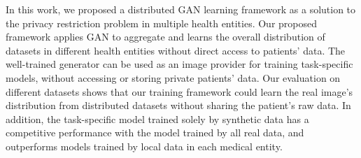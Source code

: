In this work, we proposed a distributed GAN learning framework as a solution to the privacy restriction problem in multiple health entities. Our proposed framework applies GAN to aggregate and learns the overall distribution of datasets in different health entities without direct access to patients' data. The well-trained generator can be used as an image provider for training task-specific models, without accessing or storing private patients' data. Our evaluation on different datasets shows that our training framework could learn the real image's distribution from distributed datasets without sharing the patient's raw data. In addition, the task-specific model trained solely by synthetic data has a competitive performance with the model trained by all real data, and outperforms models trained by local data in each medical entity.
